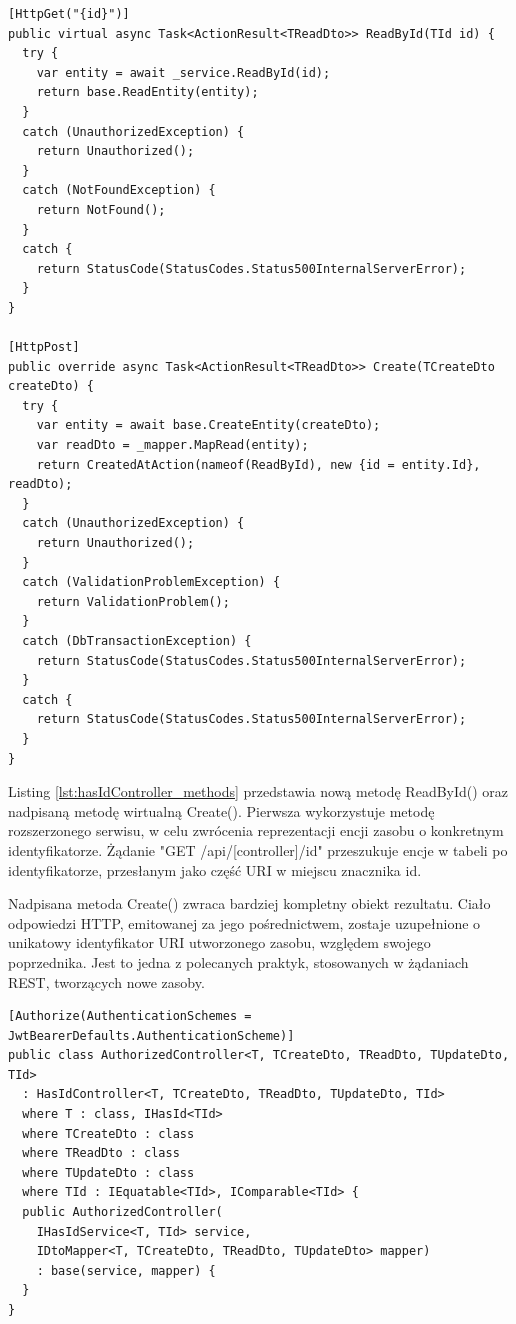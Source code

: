 \begin{lstlisting}[language=CSharp, caption={Przykładowe metody generycznej klasy kontrolera zasobów posiadających klucz główny}, label=lst:hasIdController_methods]
[HttpGet("{id}")]
public virtual async Task<ActionResult<TReadDto>> ReadById(TId id) {
  try {
    var entity = await _service.ReadById(id);
    return base.ReadEntity(entity);
  }
  catch (UnauthorizedException) {
    return Unauthorized();
  }
  catch (NotFoundException) {
    return NotFound();
  }
  catch {
    return StatusCode(StatusCodes.Status500InternalServerError);
  }
}

[HttpPost]
public override async Task<ActionResult<TReadDto>> Create(TCreateDto createDto) {
  try {
    var entity = await base.CreateEntity(createDto);
    var readDto = _mapper.MapRead(entity);
    return CreatedAtAction(nameof(ReadById), new {id = entity.Id}, readDto);
  }
  catch (UnauthorizedException) {
    return Unauthorized();
  }
  catch (ValidationProblemException) {
    return ValidationProblem();
  }
  catch (DbTransactionException) {
    return StatusCode(StatusCodes.Status500InternalServerError);
  }
  catch {
    return StatusCode(StatusCodes.Status500InternalServerError);
  }
}
\end{lstlisting}

Listing \ref{lst:hasIdController_methods} przedstawia nową metodę ReadById() oraz nadpisaną metodę wirtualną Create(). Pierwsza wykorzystuje metodę rozszerzonego serwisu, w celu zwrócenia reprezentacji encji zasobu o konkretnym identyfikatorze. Żądanie "GET /api/[controller]/{id}" przeszukuje encje w tabeli po identyfikatorze, przesłanym jako część URI w miejscu znacznika {id}. 

Nadpisana metoda Create() zwraca bardziej kompletny obiekt rezultatu. Ciało odpowiedzi HTTP, emitowanej za jego pośrednictwem, zostaje uzupełnione o unikatowy identyfikator URI utworzonego zasobu, względem swojego poprzednika. Jest to jedna z polecanych praktyk, stosowanych w żądaniach REST, tworzących nowe zasoby.

\begin{lstlisting}[language=CSharp, caption={Generyczna klasa kontrolera autoryzowanego}, label=lst:authorizedController]
[Authorize(AuthenticationSchemes = JwtBearerDefaults.AuthenticationScheme)]
public class AuthorizedController<T, TCreateDto, TReadDto, TUpdateDto, TId>
  : HasIdController<T, TCreateDto, TReadDto, TUpdateDto, TId>
  where T : class, IHasId<TId>
  where TCreateDto : class
  where TReadDto : class
  where TUpdateDto : class
  where TId : IEquatable<TId>, IComparable<TId> {
  public AuthorizedController(
    IHasIdService<T, TId> service,
    IDtoMapper<T, TCreateDto, TReadDto, TUpdateDto> mapper)
    : base(service, mapper) {
  }
}
\end{lstlisting}

